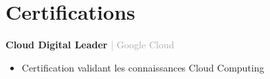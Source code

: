 
\section{\icon{\faCertificate} Certifications}
\begin{minipage}[t]{0.45\textwidth}
    \textbf{\color{mainblue}Cloud Digital Leader} \textcolor{darkgray}{| Google Cloud}
    \begin{itemize}
        \item Certification validant les connaissances Cloud Computing
    \end{itemize}
\end{minipage}

